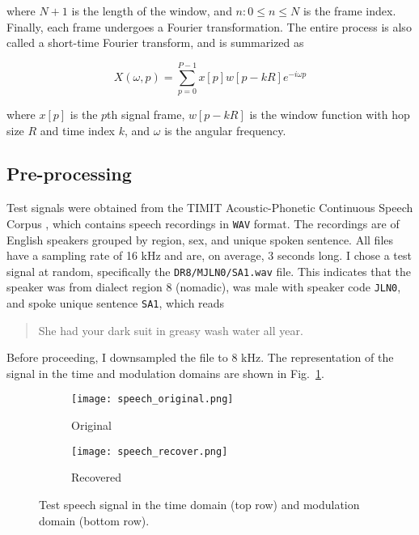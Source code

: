 \noindent where $N + 1$ is the length of the window, and $n: 0 \leq n \leq N$ is the frame index. Finally, each frame undergoes a Fourier transformation. The entire process is also called a short-time Fourier transform, and is summarized as

\begin{equation}
	\label{eq:stft}
	X(\omega, p) = \sum_{p=0}^{P-1} x[p] w[p - kR] e^{-i\omega p}
\end{equation}

\noindent where $x[p]$ is the $p$th signal frame, $w[p - kR]$ is the window function with hop size $R$ and time index $k$, and $\omega$ is the angular frequency.

\subsection{Pre-processing}
\label{ssec:audio-speech-preprocess}
Test signals were obtained from the TIMIT Acoustic-Phonetic Continuous Speech Corpus \cite{timit}, which contains speech recordings in \texttt{WAV} format. The recordings are of English speakers grouped by region, sex, and unique spoken sentence. All files have a sampling rate of 16 kHz and are, on average, 3 seconds long. I chose a test signal at random, specifically the \texttt{DR8/MJLN0/SA1.wav} file. This indicates that the speaker was from dialect region 8 (nomadic), was male with speaker code \texttt{JLN0}, and spoke unique sentence \texttt{SA1}, which reads

\begin{quotation}
	She had your dark suit in greasy wash water all year.
\end{quotation}

Before proceeding, I downsampled the file to 8 kHz. The representation of the signal in the time and modulation domains are shown in Fig.~\ref{fig:speech-original}.

\begin{figure}[htb]
	\centering
	\begin{subfigure}{0.49\textwidth}
		\centering
		\texttt{[image: speech\_original.png]}
		\caption{Original}
		\label{fig:speech-original}
	\end{subfigure}
	\begin{subfigure}{0.49\textwidth}
		\centering
		\texttt{[image: speech\_recover.png]}
		\caption{Recovered}
		\label{fig:speech-recovered}
	\end{subfigure}
	\caption{Test speech signal in the time domain (top row) and modulation domain (bottom row).}
	\label{fig:speech}
\end{figure}

